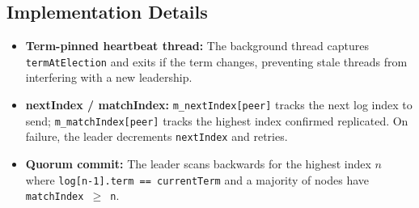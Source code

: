 \documentclass[11pt, a4paper]{article}
\begin{document}
\subsection{Implementation Details}
\begin{itemize}[leftmargin=*]
    \item \textbf{Term-pinned heartbeat thread:} The background thread
          captures \texttt{termAtElection} and exits if the term changes,
          preventing stale threads from interfering with a new leadership.
    \item \textbf{nextIndex / matchIndex:} \texttt{m\_nextIndex[peer]}
          tracks the next log index to send; \texttt{m\_matchIndex[peer]}
          tracks the highest index confirmed replicated. On failure, the
          leader decrements \texttt{nextIndex} and retries.
    \item \textbf{Quorum commit:} The leader scans backwards for the highest
          index $n$ where \texttt{log[n-1].term == currentTerm} and a
          majority of nodes have \texttt{matchIndex $\geq$ n}.
\end{itemize}
\end{document}
